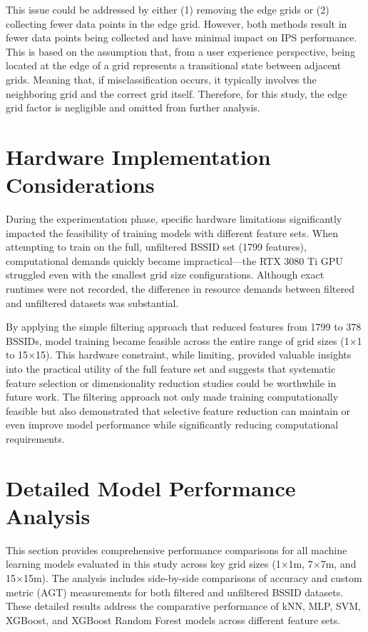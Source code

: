 \documentclass[runningheads]{llncs}
\begin{document}
This issue could be addressed by either (1) removing the edge grids or (2) collecting fewer data points in the edge grid. However, both methods result in fewer data points being collected and have minimal impact on IPS performance. This is based on the assumption that, from a user experience perspective, being located at the edge of a grid represents a transitional state between adjacent grids. Meaning that, if misclassification occurs, it typically involves the neighboring grid and the correct grid itself. Therefore, for this study, the edge grid factor is negligible and omitted from further analysis.

\section{Hardware Implementation Considerations}
During the experimentation phase, specific hardware limitations significantly impacted the feasibility of training models with different feature sets. When attempting to train on the full, unfiltered BSSID set (1799 features), computational demands quickly became impractical—the RTX 3080 Ti GPU struggled even with the smallest grid size configurations. Although exact runtimes were not recorded, the difference in resource demands between filtered and unfiltered datasets was substantial.

By applying the simple filtering approach that reduced features from 1799 to 378 BSSIDs, model training became feasible across the entire range of grid sizes (1×1 to 15×15). This hardware constraint, while limiting, provided valuable insights into the practical utility of the full feature set and suggests that systematic feature selection or dimensionality reduction studies could be worthwhile in future work. The filtering approach not only made training computationally feasible but also demonstrated that selective feature reduction can maintain or even improve model performance while significantly reducing computational requirements.

\section{Detailed Model Performance Analysis}

This section provides comprehensive performance comparisons for all machine learning models evaluated in this study across key grid sizes (1×1m, 7×7m, and 15×15m). The analysis includes side-by-side comparisons of accuracy and custom metric (AGT) measurements for both filtered and unfiltered BSSID datasets. These detailed results address the comparative performance of kNN, MLP, SVM, XGBoost, and XGBoost Random Forest models across different feature sets.
\end{document}
